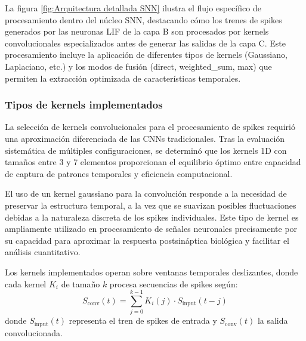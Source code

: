 La figura \ref{fig:Arquitectura detallada SNN} ilustra el flujo específico de procesamiento dentro del núcleo SNN, destacando cómo los trenes de spikes generados por las neuronas LIF de la capa B son procesados por kernels convolucionales especializados antes de generar las salidas de la capa C. Este procesamiento incluye la aplicación de diferentes tipos de kernels (Gaussiano, Laplaciano, etc.) y los modos de fusión (direct, weighted\_sum, max) que permiten la extracción optimizada de características temporales.


\subsubsection {Tipos de kernels implementados}

La selección de kernels convolucionales para el procesamiento de spikes requirió una aproximación diferenciada de las CNNs tradicionales. Tras la evaluación sistemática de múltiples configuraciones, se determinó que los kernels 1D con tamaños entre 3 y 7 elementos proporcionan el equilibrio óptimo entre capacidad de captura de patrones temporales y eficiencia computacional.

El uso de un kernel gaussiano para la convolución responde a la necesidad de preservar la estructura temporal, a la vez que se suavizan posibles fluctuaciones debidas a la naturaleza discreta de los spikes individuales. Este tipo de kernel es ampliamente utilizado en procesamiento de señales neuronales precisamente por su capacidad para aproximar la respuesta postsináptica biológica y facilitar el análisis cuantitativo.

Los kernels implementados operan sobre ventanas temporales deslizantes, donde cada kernel \( K_i \) de tamaño \( k \) procesa secuencias de spikes según:
\begin{equation}
    S_{\text{conv}}(t) = \sum_{j=0}^{k-1} K_i(j) \cdot S_{\text{input}}(t-j)
\end{equation}
donde \( S_{\text{input}}(t) \) representa el tren de spikes de entrada y \( S_{\text{conv}}(t) \) la salida convolucionada.



